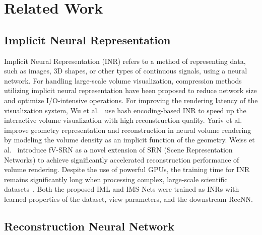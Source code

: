 \section{Related Work} 
\label{related work}
\subsection{Implicit Neural Representation}
Implicit Neural Representation (INR) refers to a method of representing data, such as images, 3D shapes, or other types of continuous signals, using a neural network. For handling large-scale volume visualization, compression methods utilizing implicit neural representation \cite{lu2021compressive, tang2020deep} have been proposed to reduce network size and optimize I/O-intensive operations. For improving the rendering latency of the visualization system, Wu et al.~\cite{10175377} use hash encoding-based INR to speed up the interactive volume visualization with high reconstruction quality. Yariv et al.~\cite{NEURIPS2021_25e2a30f} improve geometry representation and reconstruction in neural volume rendering by modeling the volume density as an implicit function of the geometry. Weiss et al.~\cite{weiss2022fast} introduce fV-SRN as a novel extension of SRN (Scene Representation Networks) to achieve significantly accelerated reconstruction performance of volume rendering. Despite the use of powerful GPUs, the training time for INR remains significantly long when processing complex, large-scale scientific datasets~\cite{TANG2024103874, 10175377}. Both the proposed IML and IMS Nets were trained as INRs with learned properties of the dataset, view parameters, and the downstream RecNN.

\subsection{Reconstruction Neural Network}

